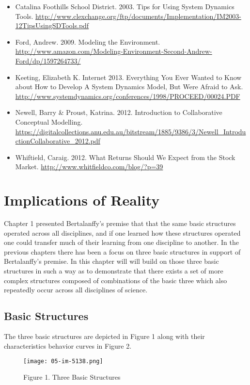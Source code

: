 \documentclass[]{memoir}
\let\Oldincludegraphics\includegraphics
\renewcommand{\includegraphics}[1]{\Oldincludegraphics[max size={\textwidth}{\textheight}]{#1}}
\begin{document}
\begin{itemize}
\itemsep1pt\parskip0pt
\item
  Catalina Foothills School District. 2003. Tips for Using System
  Dynamics Tools.
  \url{http://www.clexchange.org/ftp/documents/Implementation/IM2003-12TipsUsingSDTools.pdf}
\item
  Ford, Andrew. 2009. Modeling the Environment.
  \url{http://www.amazon.com/Modeling-Environment-Second-Andrew-Ford/dp/1597264733/}
\item
  Keeting, Elizabeth K. Internet 2013. Everything You Ever Wanted to
  Know about How to Develop A System Dynamics Model, But Were Afraid to
  Ask.
  \url{http://www.systemdynamics.org/conferences/1998/PROCEED/00024.PDF}
\item
  Newell, Barry \& Proust, Katrina. 2012. Introduction to Collaborative
  Conceptual Modelling.
  \url{https://digitalcollections.anu.edu.au/bitstream/1885/9386/3/Newell_IntroductionCollaborative_2012.pdf}
\item
  Whiftield, Caraig. 2012. What Returns Should We Expect from the Stock
  Market. \url{http://www.whitfieldco.com/blog/?p=39}
\end{itemize}

\chapter{Implications of Reality}

Chapter 1 presented Bertalanffy's premise that that the same basic
structures operated across all disciplines, and if one learned how these
structures operated one could transfer much of their learning from one
discipline to another. In the previous chapters there has been a focus
on three basic structures in support of Bertalanffy's premise. In this
chapter will will build on those three basic structures in such a way as
to demonstrate that there exists a set of more complex structures
composed of combinations of the basic three which also repeatedly occur
across all disciplines of science.

\section{Basic Structures}

The three basic structures are depicted in Figure 1 along with their
characteristics behavior curves in Figure 2.

\begin{figure}[htbp]
\centering
\texttt{[image: 05-im-5138.png]}
\caption{Figure 1. Three Basic Structures}
\end{figure}
\end{document}

